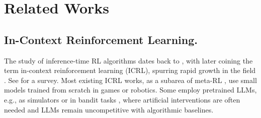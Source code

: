 \documentclass{article}
\newcommand{\0}{\mathbf{0}}
\begin{document}
\section{Related Works}
\subsection{In-Context Reinforcement Learning.}
The study of inference-time RL algorithms dates back to \citet{duan2016rl,wang2016learning}, with \citet{laskin2023incontext} later coining the term in-context reinforcement learning (ICRL), spurring rapid growth in the field \citep{kirsch2023towards,raparthy2023generalization,schmiedLargeRecurrentAction2024,lee2024supervised,zisman2023emergence,grigsby2023amago,lus42023,bauer2023human,wang2025transformers,cook2024artificial,xu2024meta,shi2024cross,huang2024context,liuEmergentAgenticTransformer2023,dai2024context}. See \citet{moeini2025survey} for a survey. Most existing ICRL works, as a subarea of meta-RL \citep{beck2023survey}, use small models trained from scratch in games or robotics. Some employ pretrained LLMs, e.g., as simulators \citep{brooks2024large,mirchandani_large_2023, resendiz2025parlpromptbasedagentsreinforcement} or in bandit tasks \citep{krishnamurthy2024can,nieEVOLvEEvaluatingOptimizing2024,park2024llm,monea2025llmsincontextbanditreinforcement}, where artificial interventions are often needed and LLMs remain uncompetitive with algorithmic baselines.
\end{document}
